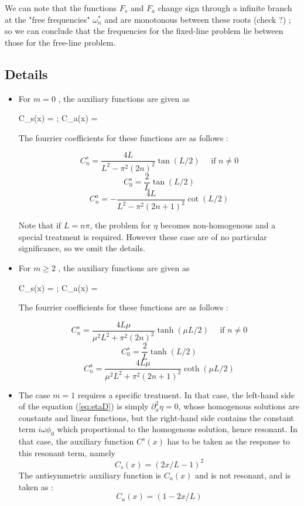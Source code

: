 We can note that the functions $F_s$ and $F_a$ change sign through a infinite branch at the "free frequencies" $\omega^*_{n}$ and are monotonous between these roots  (check ?) ; so we can conclude that the frequencies for the fixed-line problem lie between those for the free-line problem.




\subsection{Details}

\begin{itemize}

\item
For $m=0$ , the auxiliary functions are given as 

\be
C_s(x) =  ; \quad C_a(x) = 
\ee

The fourrier coefficients for these functions are as follows :

$$
C^s_{n} = \frac{4 L}{L^2 - \pi^2 (2n)^2} \tan (L/2) \quad \mbox{ if } n\ne 0
$$
$$
C^s_0 = \frac{2}{L} \tan (L/2)
$$
$$
C^a_{n} = - \frac{4 L}{L^2 - \pi^2 (2n+1)^2} \cot (L/2) 
$$

Note that if $L = n \pi$, the problem for $\eta$ becomes non-homogenous  and a special treatment is required. However these case are of no particular significance, so we omit the details.


\item
For $m\ge 2$ , the auxiliary functions are given as 


\be
C_s(x) =  ; \quad C_a(x) = 
\ee

The fourrier coefficients for these functions are as follows :

$$
C^s_{n} = \frac{4 L\mu }{\mu^2 L^2 + \pi^2 (2n)^2} \tanh (\mu L/2) \quad \mbox{ if } n\ne 0
$$
$$
C^s_0 = \frac{2}{L} \tanh (L/2)
$$
$$
C^a_{n} = \frac{4 L\mu }{\mu^2 L^2 + \pi^2 (2n+1)^2} \coth (\mu L/2)
$$

\item The case $m=1$ requires a specific treatment. In that case, the left-hand side of the equation (\ref{eq:etaD}) is simply $\partial_x^2 \eta = 0$, whose homogenous solutions are constants and linear functions, but the right-hand side contains the constant term $i \omega \phi_0$ which proportional to the homogenous solution, hence resonant. In that case,
the auxiliary function $C^s(x)$ has to be taken as the response to this resonant term, namely 
$$
C_s(x) = (2x/L-1)^2
$$
The antisymmetric auxiliary function is $C_a(x)$ and is not resonant, and is taken as :
$$
C_a(x) = (1- 2x/L)
$$


\end{itemize}
